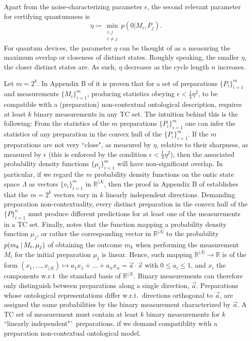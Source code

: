 Apart from the noise-characterizing parameter $\epsilon$, the second relevant parameter for certifying quantumness is
\begin{equation*}
\eta\coloneqq \min_{\substack{i,j \\ i\neq j}} p(0\vert M_i, P_j).
\end{equation*}
For quantum devices, the parameter $\eta$ can be thought of as a measuring the maximum overlap or closeness of distinct states. Roughly speaking, the smaller $\eta$, the closer distinct states are. As such, $\eta$ decreases as the cycle length $n$ increases. 

Let $m=2^k$. In Appendix B of \cite{Pusey2019a} it is proven that for a set of preparations $\{P_i\}_{i=1}^m$ and measurements $\{M_i\}_{i=1}^m$, producing statistics obeying $\epsilon<\frac{1}{4}\eta^2$, to be compatible with a (preparation) non-contextual ontological description, requires at least $k$ binary measurements in any TC set. The intuition behind this is the following: From the statistics of the $m$ preparations $\{P_i\}_{i=1}^m$ one can infer the statistics of any preparation in the convex hull of the $\{P_i\}_{i=1}^m$. If the $m$ preparations are not very ``close", as measured by $\eta$, relative to their sharpness, as measured by $\epsilon$ (this is enforced by the condition $\epsilon<\frac{1}{4}\eta^2$), then the associated probability density functions $\{\mu_i\}_{i=1}^m$ will have non-significant overlap. In particular, if we regard the $m$ probability density functions on the ontic state space $\Lambda$ as vectors $\{v_i\}_{i=1}^m$ in $\mathbb{R}^{\vert \Lambda \vert}$, then the proof in Appendix B of \cite{Pusey2019a} establishes that the $m=2^k$ vectors vary in $k$ linearly independent directions. Demanding preparation non-contextuality, every distinct preparation in the convex hull of the $\{P\}_{i=1}^n$ must produce different predictions for at least one of the measurements in a TC set. Finally, \cite{Pusey2019a} notes that the function mapping a probability density function $\mu_j$, or rather the corresponding vector in $\mathbb{R}^{\vert \Lambda \vert}$ to the probability $p(m_k\thinspace\vert\thinspace M_i,\mu_j)$ of obtaining the outcome $m_k$ when performing the measurement $M_i$ for the initial preparation $\mu_j$ is linear. Hence, such mapping $\mathbb{R}^{\vert \Lambda \vert}\rightarrow\mathbb{R}$ is of the form $(x_1,\dots,x_{\vert \Lambda \vert})\mapsto a_1 x_1+\dots + a_n x_n = \vec{a}\cdot \vec{x}$ with $0 \leq a_i \leq 1$, and $x_i$ the components w.r.t\ the standard basis of $\mathbb{R}^{\vert \Lambda \vert}$. Binary measurements can therefore only distinguish between preparations along a single direction, $\vec{a}$. Preparations whose ontological representations differ w.r.t.\ directions orthogonal to $\vec{a}$, are assigned the same probabilities by the binary measurement characterized by $\vec{a}$. A TC set of measurement must contain at least $k$ binary measurements for $k$ ``linearly independent"` preparations, if we demand compatiblity with a preparation non-contextual ontological model.

